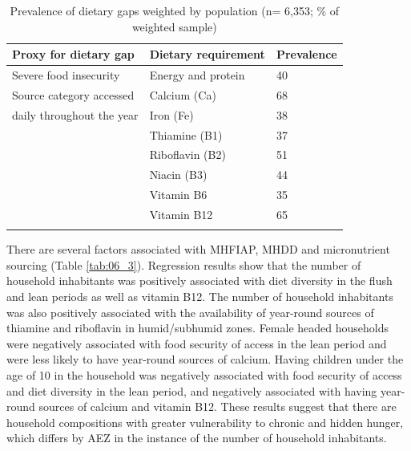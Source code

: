 \begin{table}[H]
  \setlength\dashlinedash{0.2pt}
  \setlength\dashlinegap{1.5pt}
  \setlength\arrayrulewidth{0.3pt}

  \captionsetup{singlelinecheck = false, justification=justified}
  \caption{Prevalence of dietary gaps weighted by population (n= 6,353; \% of weighted sample)}
  \label{tab:06_2}
  \small
\begin{tabular}{L{4.5cm} L{3cm} C{2.5cm}}
\toprule
Proxy for dietary gap & Dietary requirement & Prevalence \\
\midrule
Severe food insecurity & Energy and protein & 40 \\
\midrule
Source category accessed & Calcium (Ca) & 68 \\
daily throughout the year & Iron (Fe) & 38 \\
 & Thiamine (B1) & 37 \\
 & Riboflavin (B2) & 51 \\
 & Niacin (B3) & 44 \\
 & Vitamin B6 & 35 \\
 & Vitamin B12 & 65 \\
 \bottomrule
\end{tabular}
\end{table}

There are several factors associated with MHFIAP, MHDD and micronutrient sourcing (Table \ref{tab:06_3}). Regression results show that the number of household inhabitants was positively associated with diet diversity in the flush and lean periods as well as vitamin B12. The number of household inhabitants was also positively associated with the availability of year-round sources of thiamine and riboflavin in humid/subhumid zones. Female headed households were negatively associated with food security of access in the lean period and were less likely to have year-round sources of calcium. Having children under the age of 10 in the household was negatively associated with food security of access and diet diversity in the lean period, and negatively associated with having year-round sources of calcium and vitamin B12. These results suggest that there are household compositions with greater vulnerability to chronic and hidden hunger, which differs by AEZ in the instance of the number of household inhabitants.


